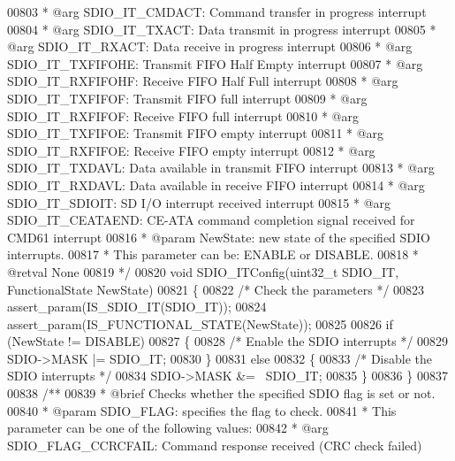 \begin{DoxyCode}
00803 \textcolor{comment}{  *            @arg SDIO\_IT\_CMDACT:   Command transfer in progress interrupt}
00804 \textcolor{comment}{  *            @arg SDIO\_IT\_TXACT:    Data transmit in progress interrupt}
00805 \textcolor{comment}{  *            @arg SDIO\_IT\_RXACT:    Data receive in progress interrupt}
00806 \textcolor{comment}{  *            @arg SDIO\_IT\_TXFIFOHE: Transmit FIFO Half Empty interrupt}
00807 \textcolor{comment}{  *            @arg SDIO\_IT\_RXFIFOHF: Receive FIFO Half Full interrupt}
00808 \textcolor{comment}{  *            @arg SDIO\_IT\_TXFIFOF:  Transmit FIFO full interrupt}
00809 \textcolor{comment}{  *            @arg SDIO\_IT\_RXFIFOF:  Receive FIFO full interrupt}
00810 \textcolor{comment}{  *            @arg SDIO\_IT\_TXFIFOE:  Transmit FIFO empty interrupt}
00811 \textcolor{comment}{  *            @arg SDIO\_IT\_RXFIFOE:  Receive FIFO empty interrupt}
00812 \textcolor{comment}{  *            @arg SDIO\_IT\_TXDAVL:   Data available in transmit FIFO interrupt}
00813 \textcolor{comment}{  *            @arg SDIO\_IT\_RXDAVL:   Data available in receive FIFO interrupt}
00814 \textcolor{comment}{  *            @arg SDIO\_IT\_SDIOIT:   SD I/O interrupt received interrupt}
00815 \textcolor{comment}{  *            @arg SDIO\_IT\_CEATAEND: CE-ATA command completion signal received for CMD61 interrupt}
00816 \textcolor{comment}{  * @param  NewState: new state of the specified SDIO interrupts.}
00817 \textcolor{comment}{  *          This parameter can be: ENABLE or DISABLE.}
00818 \textcolor{comment}{  * @retval None }
00819 \textcolor{comment}{  */}
00820 \textcolor{keywordtype}{void} SDIO_ITConfig(uint32\_t SDIO\_IT, FunctionalState NewState)
00821 \{
00822   \textcolor{comment}{/* Check the parameters */}
00823   assert_param(IS\_SDIO\_IT(SDIO\_IT));
00824   assert_param(IS\_FUNCTIONAL\_STATE(NewState));
00825 
00826   \textcolor{keywordflow}{if} (NewState != DISABLE)
00827   \{
00828     \textcolor{comment}{/* Enable the SDIO interrupts */}
00829     SDIO->MASK |= SDIO\_IT;
00830   \}
00831   \textcolor{keywordflow}{else}
00832   \{
00833     \textcolor{comment}{/* Disable the SDIO interrupts */}
00834     SDIO->MASK &= ~SDIO\_IT;
00835   \}
00836 \}
00837 
00838 \textcolor{comment}{/**}
00839 \textcolor{comment}{  * @brief  Checks whether the specified SDIO flag is set or not.}
00840 \textcolor{comment}{  * @param  SDIO\_FLAG: specifies the flag to check. }
00841 \textcolor{comment}{  *          This parameter can be one of the following values:}
00842 \textcolor{comment}{  *            @arg SDIO\_FLAG\_CCRCFAIL: Command response received (CRC check failed)}

\end{DoxyCode}
